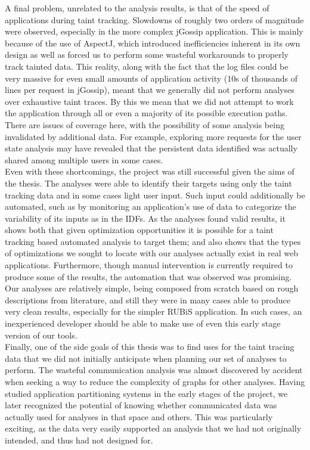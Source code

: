 \documentclass[msc,oneside]{ubcthesis}
\begin{document}
A final problem, unrelated to the analysis results, is that of the speed of applications during taint tracking. Slowdowns of roughly two orders of magnitude were observed, especially in the more complex jGossip application. This is mainly because of the use of AspectJ, which introduced inefficiencies inherent in its own design as well as forced us to perform some wasteful workarounds to properly track tainted data. This reality, along with the fact that the log files could be very massive for even small amounts of application activity (10s of thousands of lines per request in jGossip), meant that we generally did not perform analyses over exhaustive taint traces. By this we mean that we did not attempt to work the application through all or even a majority of its possible execution paths. There are issues of coverage here, with the possibility of some analysis being invalidated by additional data. For example, exploring more requests for the user state analysis may have revealed that the persistent data identified was actually shared among multiple users in some cases.\\

Even with these shortcomings, the project was still successful given the aims of the thesis. The analyses were able to identify their targets using only the taint tracking data and in some cases light user input. Such input could additionally be automated, such as by monitoring an application's use of data to categorize the variability of its inputs as in the IDFs. As the analyses found valid results, it shows both that given optimization opportunities it is possible for a taint tracking based automated analysis to target them; and also shows that the types of optimizations we sought to locate with our analyses actually exist in real web applications. Furthermore, though manual intervention is currently required to produce some of the results, the automation that was observed was promising. Our analyses are relatively simple, being composed from scratch based on rough descriptions from literature, and still they were in many cases able to produce very clean results, especially for the simpler RUBiS application. In such cases, an inexperienced developer should be able to make use of even this early stage version of our tools.\\

Finally, one of the side goals of this thesis was to find uses for the taint tracing data that we did not initially anticipate when planning our set of analyses to perform. The wasteful communication analysis was almost discovered by accident when seeking a way to reduce the complexity of graphs for other analyses. Having studied application partitioning systems in the early stages of the project, we later recognized the potential of knowing whether communicated data was actually used for analyses in that space and others. This was particularly exciting, as the data very easily supported an analysis that we had not originally intended, and thus had not designed for.
\end{document}
